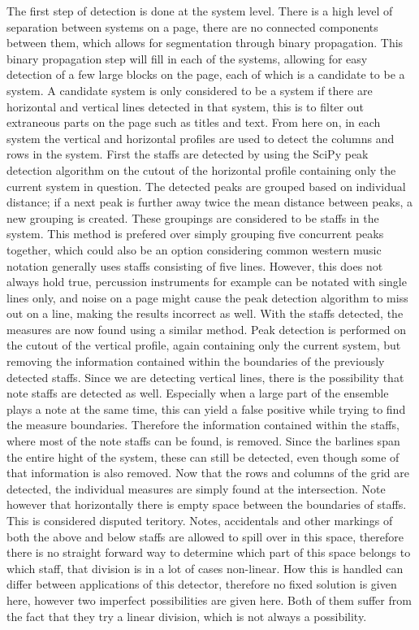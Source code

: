 The first step of detection is done at the system level. There is a high level of separation between systems on a page, there are no connected components between them, which allows for segmentation through binary propagation. This binary propagation step will fill in each of the systems, allowing for easy detection of a few large blocks on the page, each of which is a candidate to be a system. A candidate system is only considered to be a system if there are horizontal and vertical lines detected in that system, this is to filter out extraneous parts on the page such as titles and text. From here on, in each system the vertical and horizontal profiles are used to detect the columns and rows in the system. First the staffs are detected by using the SciPy peak detection algorithm \citeneeded on the cutout of the horizontal profile containing only the current system in question. The detected peaks are grouped based on individual distance; if a next peak is further away twice the mean distance between peaks, a new grouping is created. These groupings are considered to be staffs in the system. This method is prefered over simply grouping five concurrent peaks together, which could also be an option considering common western music notation generally uses staffs consisting of five lines. However, this does not always hold true, percussion instruments for example can be notated with single lines only, and noise on a page might cause the peak detection algorithm to miss out on a line, making the results incorrect as well. With the staffs detected, the measures are now found using a similar method. Peak detection is performed on the cutout of the vertical profile, again containing only the current system, but removing the information contained within the boundaries of the previously detected staffs. Since we are detecting vertical lines, there is the possibility that note staffs are detected as well. Especially when a large part of the ensemble plays a note at the same time, this can yield a false positive while trying to find the measure boundaries. Therefore the information contained within the staffs, where most of the note staffs can be found, is removed. Since the barlines span the entire hight of the system, these can still be detected, even though some of that information is also removed. Now that the rows and columns of the grid are detected, the individual measures are simply found at the intersection. Note however that horizontally there is empty space between the boundaries of staffs. This is considered disputed teritory. Notes, accidentals and other markings of both the above and below staffs are allowed to spill over in this space, therefore there is no straight forward way to determine which part of this space belongs to which staff, that division is in a lot of cases non-linear. How this is handled can differ between applications of this detector, therefore no fixed solution is given here, however two imperfect possibilities are given here. Both of them suffer from the fact that they try a linear division, which is not always a possibility.

